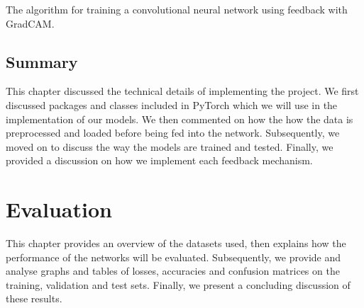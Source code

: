 \documentclass{l4proj}
\begin{document}
\begin{algorithm}
    \DontPrintSemicolon
    \CommentSty{\color{black}}
    
\caption{The algorithm for training a convolutional neural network using feedback with GradCAM. }\label{alg:gradcam}
\end{algorithm}



\section{Summary}
This chapter discussed the technical details of implementing the project. We first discussed packages and classes included in PyTorch which we will use in the implementation of our models. We then commented on how the how the data is preprocessed and loaded before being fed into the network. Subsequently, we moved on to discuss the way the models are trained and tested. Finally, we provided a discussion on how we implement each feedback mechanism. 

\chapter{Evaluation}
\label{chap:evaluation}
This chapter provides an overview of the datasets used, then explains how the performance of the networks will be evaluated. Subsequently, we provide and analyse graphs and tables of losses, accuracies and confusion matrices on the training, validation and test sets. Finally, we present a concluding discussion of these results.
\end{document}
